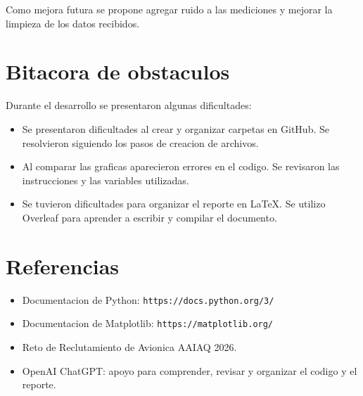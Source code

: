 \documentclass[10pt]{article}
\begin{document}
Como mejora futura se propone agregar ruido
a las mediciones y mejorar la limpieza de los
datos recibidos.

\section{Bitacora de obstaculos}

Durante el desarrollo se presentaron algunas
dificultades:

\begin{itemize}

\item Se presentaron dificultades al crear y
organizar carpetas en GitHub. Se resolvieron
siguiendo los pasos de creacion de archivos.

\item Al comparar las graficas aparecieron
errores en el codigo. Se revisaron las
instrucciones y las variables utilizadas.

\item Se tuvieron dificultades para organizar
el reporte en LaTeX. Se utilizo Overleaf para
aprender a escribir y compilar el documento.

\end{itemize}

\section{Referencias}

\begin{itemize}
\item Documentacion de Python:
\texttt{https://docs.python.org/3/}

\item Documentacion de Matplotlib:
\texttt{https://matplotlib.org/}

\item Reto de Reclutamiento de Avionica AAIAQ 2026.

\item OpenAI ChatGPT: apoyo para comprender,
revisar y organizar el codigo y el reporte.
\end{itemize}
\end{document}
